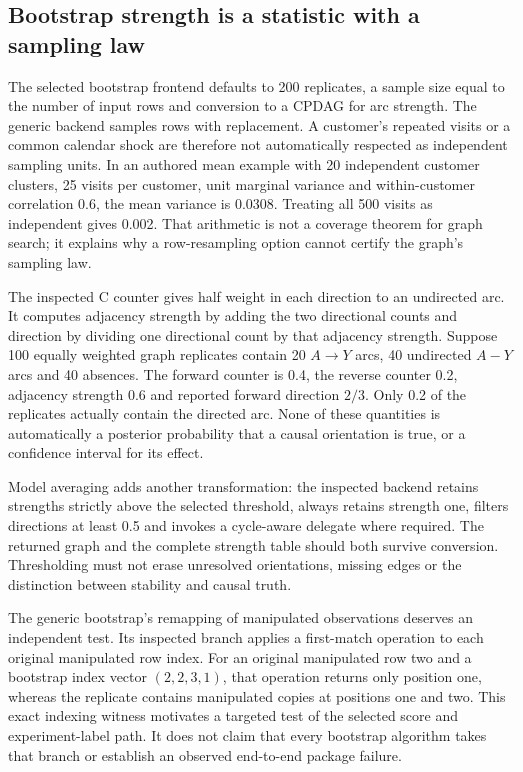 \subsection{Bootstrap strength is a statistic with a sampling law}
The selected bootstrap frontend defaults to 200 replicates, a sample size equal to the number of input rows and conversion to a CPDAG for arc strength. The generic backend samples rows with replacement. A customer's repeated visits or a common calendar shock are therefore not automatically respected as independent sampling units. In an authored mean example with 20 independent customer clusters, 25 visits per customer, unit marginal variance and within-customer correlation 0.6, the mean variance is 0.0308. Treating all 500 visits as independent gives 0.002. That arithmetic is not a coverage theorem for graph search; it explains why a row-resampling option cannot certify the graph's sampling law.~\citep{exec24_bnlearn_sources,exec24_bnlearn_contract}

The inspected C counter gives half weight in each direction to an undirected arc. It computes adjacency strength by adding the two directional counts and direction by dividing one directional count by that adjacency strength. Suppose 100 equally weighted graph replicates contain 20 $A\to Y$ arcs, 40 undirected $A-Y$ arcs and 40 absences. The forward counter is 0.4, the reverse counter 0.2, adjacency strength 0.6 and reported forward direction $2/3$. Only 0.2 of the replicates actually contain the directed arc. None of these quantities is automatically a posterior probability that a causal orientation is true, or a confidence interval for its effect.~\citep{exec24_bnlearn_sources,exec24_bnlearn_contract}

Model averaging adds another transformation: the inspected backend retains strengths strictly above the selected threshold, always retains strength one, filters directions at least 0.5 and invokes a cycle-aware delegate where required. The returned graph and the complete strength table should both survive conversion. Thresholding must not erase unresolved orientations, missing edges or the distinction between stability and causal truth.~\citep{exec24_bnlearn_sources,exec24_bnlearn_contract}

The generic bootstrap's remapping of manipulated observations deserves an independent test. Its inspected branch applies a first-match operation to each original manipulated row index. For an original manipulated row two and a bootstrap index vector $(2,2,3,1)$, that operation returns only position one, whereas the replicate contains manipulated copies at positions one and two. This exact indexing witness motivates a targeted test of the selected score and experiment-label path. It does not claim that every bootstrap algorithm takes that branch or establish an observed end-to-end package failure.~\citep{exec24_bnlearn_sources,exec24_bnlearn_contract}

